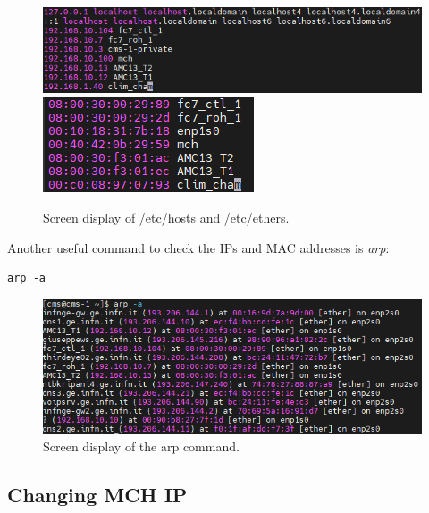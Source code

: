\documentclass[10pt,a4paper]{article}
\begin{document}
\begin{figure}[h!]
\centering
        \includegraphics[width=.8\textwidth]{hosts.png}
        \includegraphics[width=.5\textwidth]{ethers.png}
  \caption{Screen display of /etc/hosts and /etc/ethers.}
  \label{GoodHosts}
\end{figure}

Another useful command to check the IPs and MAC addresses is \emph{arp}: 

\begin{framed}
\begin{verbatim}
arp -a
\end{verbatim}
\end{framed}

\begin{figure}[h!]
\centering
 \includegraphics[width=.8\linewidth]{Pictures/arp.png} 
  \caption{Screen display of the arp command.}
  \label{telnet}
\end{figure}

\subsection{Changing MCH IP}
\end{document}
